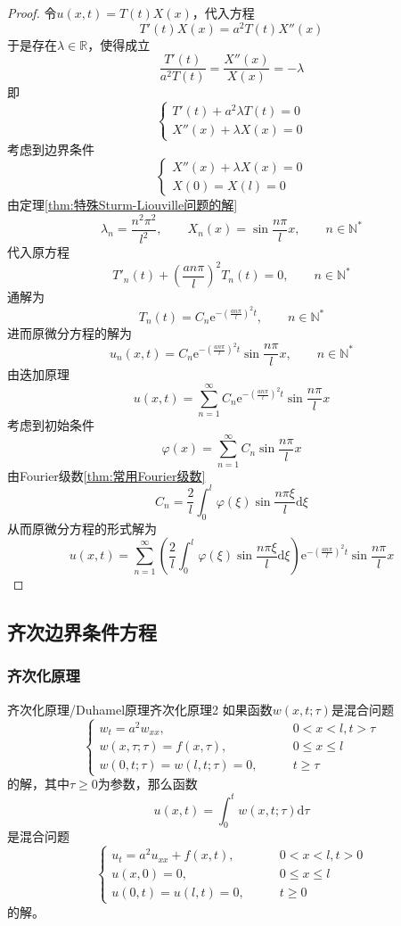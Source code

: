 \documentclass[lang = cn, scheme = chinese, thmcnt = section]{elegantbook}
\newcommand{\N}{\mathbb{N}}            %
\newcommand{\R}{\mathbb{R}}            %
\newcommand{\dd}{\mathrm{d}}           %
\begin{document}
\begin{proof}
	令$u(x,t)=T(t)X(x)$，代入方程
	$$
	T'(t)X(x)=a^2T(t)X''(x)
	$$
	于是存在$\lambda\in\R$，使得成立
	$$
	\frac{T'(t)}{a^2T(t)}
	=\frac{X''(x)}{X(x)}
	=-\lambda
	$$
	即%
	$$
	\begin{cases}
		T'(t)+a^2\lambda T(t)=0\\
		X''(x)+\lambda X(x)=0
	\end{cases}
	$$
	考虑到边界条件%
	$$
	\begin{cases}
		X''(x)+\lambda X(x)=0\\
		X(0)=X(l)=0
	\end{cases}
	$$
	由定理\ref{thm:特殊Sturm-Liouville问题的解}
	$$
	\lambda_n=\frac{n^2\pi^2}{l^2},\qquad 
	X_n(x)=\sin\frac{n\pi}{l}x,\qquad n\in\N^*
	$$
	代入原方程
	$$
	T'_n(t)+\left(\frac{an\pi}{l}\right)^2 T_n(t)=0,\qquad n\in\N^*
	$$
	通解为
	$$
	T_n(t)=C_n\mathrm{e}^{-\left(\frac{an\pi}{l}\right)^2t},\qquad n\in\N^*
	$$
	进而原微分方程的解为
	$$
	u_n(x,t)=C_n\mathrm{e}^{-\left(\frac{an\pi}{l}\right)^2t}\sin\frac{n\pi}{l}x,\qquad n\in\N^*
	$$
	由迭加原理
	$$
	u(x,t)=\sum_{n=1}^{\infty}C_n\mathrm{e}^{-\left(\frac{an\pi}{l}\right)^2t}\sin\frac{n\pi}{l}x
	$$
	考虑到初始条件
	$$
	\varphi(x)=\sum_{n=1}^{\infty}C_n\sin\frac{n\pi}{l}x
	$$
	由Fourier级数\ref{thm:常用Fourier级数}
	$$
	C_n=\frac{2}{l}\int_{0}^{l}\varphi(\xi)\sin\frac{n\pi\xi}{l}\dd\xi
	$$
	从而原微分方程的形式解为
	$$
	u(x,t)=\sum_{n=1}^{\infty}\left(\frac{2}{l}\int_{0}^{l}\varphi(\xi)\sin\frac{n\pi\xi}{l}\dd \xi\right)\mathrm{e}^{-\left(\frac{an\pi}{l}\right)^2t}\sin\frac{n\pi}{l}x
	$$
\end{proof}

\subsection{齐次边界条件方程}

\subsubsection{齐次化原理}

\begin{theorem}{齐次化原理/Duhamel原理}{齐次化原理2}
	如果函数$ w(x,t;\tau) $是混合问题
	$$
	\begin{cases}
		w_t=a^2w_{xx},\qquad & 0<x <l,t>\tau\\
		w(x,\tau;\tau)=f(x,\tau),\qquad & 0\le x \le l\\
		w(0,t;\tau)=w(l,t;\tau)=0,\qquad & t\ge \tau
	\end{cases}
	$$
	的解，其中$\tau\ge 0$为参数，那么函数
	$$
	u(x,t)=\int_{0}^{t}w(x,t;\tau)\dd \tau
	$$
	是混合问题%
	$$
	\begin{cases}
		u_t=a^2u_{xx}+f(x,t),\qquad & 0<x<l,t>0\\
		u(x,0)=0,\qquad & 0\le x \le l\\
		u(0,t)=u(l,t)=0,\qquad & t\ge 0
	\end{cases}
	$$
	的解。
\end{theorem}
\end{document}
